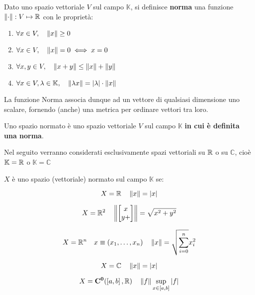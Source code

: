 \begin{definition}[Norma]
	\label{def:norma}
	Dato uno spazio vettoriale $V$ sul campo $\mathbb{K}$, si definisce \textbf{norma} una funzione $\left\|\cdot\right\|:V\mapsto\mathbb{R}$ con le proprietà:
	\begin{enumerate}
		\item $\forall x\in V,\quad\left\|x\right\|\ge0$
		\item $\forall x\in V,\quad\left\|x\right\|=0\iff x=0$
		\item $\forall x,y\in V,\quad\left\|x+y\right\|\le\left\|x\right\|+\left\|y\right\|$
		\item $\forall x\in V,\lambda\in\mathbb{K},\quad\left\|\lambda x\right\|=\left|\lambda\right|\cdot\left\|x\right\|$
	\end{enumerate}
	\begin{note}
		La funzione Norma associa dunque ad un vettore di qualsiasi dimensione uno scalare, fornendo (anche) una metrica per ordinare vettori tra loro.
	\end{note}
\end{definition}
\begin{definition}
	Uno spazio normato è uno spazio vettoriale $V$ sul campo $\mathbb{K}$ \textbf{in cui è definita una norma}.
	\begin{note}
		Nel seguito verranno considerati esclusivamente spazi vettoriali su $\mathbb{R}$ o su $\mathbb{C}$, cioè $\mathbb{K} = \mathbb{R}$ o $\mathbb{K} = \mathbb{C}$
	\end{note}
\end{definition}
$X$ è uno spazio (vettoriale) normato sul campo $\mathbb{K}$ se:
\begin{example}
$$X=\mathbb{R}\quad\left\|x\right\|=\left|x\right|$$
\end{example}
\begin{example}
	$$X=\mathbb{R}^2\quad\left\|\left[\begin{matrix}x\\y+\end{matrix}\right]\right\|=\sqrt{x^2+y^2}$$
\end{example}
\begin{example}
	$$X=\mathbb{R}^n\quad x\equiv(x_1,\ldots,x_n)\quad \left\|x\right\|=\sqrt{\sum\limits_{i=0}^n}x_i^2$$
\end{example}
\begin{example}
	$$X=\mathbb{C}\quad\left\|x\right\|=\left|x\right|$$
\end{example}
\begin{example}
	$$X=\mathbf{C^{0}}(\left[a,b\right],\mathbb{R})\quad\left\|f\right\|\sup\limits_{x\in\left[a,b\right]}\left|f\right|$$
\end{example}

